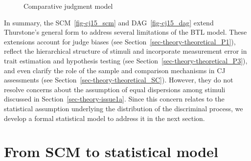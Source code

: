 \documentclass[
  authoryear,
  review,
  1p]{elsarticle}
\begin{document}
\begin{figure}[H]
\begin{minipage}{\linewidth}
{}


\end{minipage}%

\caption{\label{fig-cj15}Comparative judgment model}

\end{figure}%

In summary, the SCM~\ref{fig-cj15_scm} and DAG~\ref{fig-cj15_dag} extend
Thurstone's general form to address several limitations of the BTL
model. These extensions account for judge biases (see
Section~\ref{sec-theory-theoretical_P1}), reflect the hierarchical
structure of stimuli and incorporate measurement error in trait
estimation and hypothesis testing (see
Section~\ref{sec-theory-theoretical_P3}), and even clarify the role of
the sample and comparison mechanisms in CJ assessments (see
Section~\ref{sec-theory-theoretical_SC}). However, they do not resolve
concerns about the assumption of equal dispersions among stimuli
discussed in Section~\ref{sec-theory-issue1a}. Since this concern
relates to the statistical assumption underlying the distribution of the
discriminal process, we develop a formal statistical model to address it
in the next section.

\section{From SCM to statistical model}\label{sec-statistical}
\end{document}
